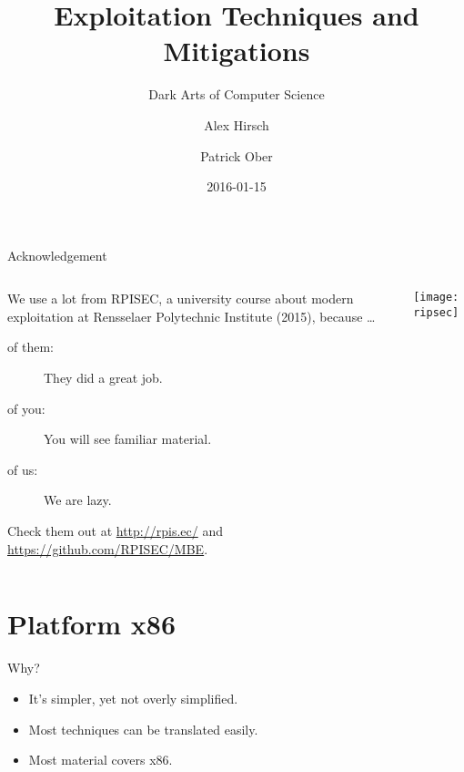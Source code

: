 \documentclass[beamer]{uibk}
\title{Exploitation Techniques and Mitigations}
\subtitle{Dark Arts of Computer Science}
\author{Alex Hirsch \and Patrick Ober}
\date{2016-01-15}
\begin{document}
\maketitle


\begin{frame}{Acknowledgement}
    \begin{columns}
        \begin{column}{0.5\textwidth}
            We use a lot from RPISEC, a university course about modern
            exploitation at Rensselaer Polytechnic Institute (2015), because
            \dots

            \begin{description}
                \item[of them:] They did a great job.
                \item[of you:] You will see familiar material.
                \item[of us:] We are lazy.
            \end{description}

            Check them out at \url{http://rpis.ec/} and
            \url{https://github.com/RPISEC/MBE}.
        \end{column}
        \begin{column}{0.5\textwidth}
            \texttt{[image: ripsec]}
        \end{column}
    \end{columns}
\end{frame}

\section{Platform x86}

\begin{frame}{Why?}
    \begin{itemize}
        \item It's simpler, yet not overly simplified.
        \item Most techniques can be translated easily.
        \item Most material covers x86.
    \end{itemize}
\end{frame}
\end{document}
